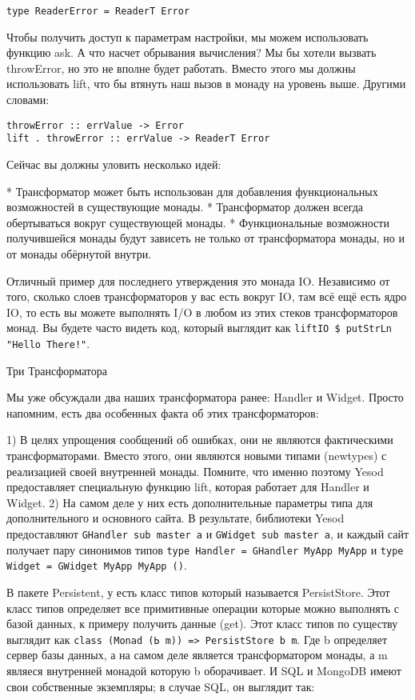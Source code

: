 \begin{lstlisting}
type ReaderError = ReaderT Error
\end{lstlisting}

Чтобы получить доступ к параметрам настройки, мы можем использовать функцию ask. А что насчет обрывания вычисления? Мы бы хотели вызвать throwError, но это не вполне будет работать. Вместо этого мы должны использовать lift, что бы втянуть наш вызов в монаду на уровень выше. Другими словами:

\begin{lstlisting}
throwError :: errValue -> Error
lift . throwError :: errValue -> ReaderT Error
\end{lstlisting}

Сейчас вы должны уловить несколько идей:

* Трансформатор может быть использован для добавления функциональных возможностей в существующие монады.
* Трансформатор должен всегда обертываться вокруг существующей монады.
* Функциональные возможности получившейся монады будут зависеть не только от трансформатора монады, но и от монады обёрнутой внутри.

Отличный пример для последнего утверждения это монада IO. Независимо от того, сколько слоев трансформаторов у вас есть вокруг IO, там всё ещё есть ядро IO, то есть вы можете выполнять I/O в любом из этих стеков трансформаторов монад. Вы будете часто видеть код, который выглядит как \lstinline'liftIO $ putStrLn "Hello There!"'.

Три Трансформатора

Мы уже обсуждали два наших трансформатора ранее: Handler и Widget. Просто напомним, есть два особенных факта об этих трансформаторов:

1) В целях упрощения сообщений об ошибках, они не являются фактическими трансформаторами. Вместо этого, они являются новыми типами (newtypes) с реализацией своей внутренней монады. Помните, что именно поэтому Yesod предоставляет специальную функцию lift, которая работает для Handler и Widget.
2) На самом деле у них есть дополнительные параметры типа для дополнительного и основного сайта. В результате, библиотеки Yesod предоставляют \lstinline'GHandler sub master a' и \lstinline'GWidget sub master a', и каждый сайт получает пару синонимов типов \lstinline'type Handler = GHandler MyApp MyApp' и \lstinline'type Widget = GWidget MyApp MyApp ()'.

В пакете Persistent, у есть класс типов который называется PersistStore. Этот класс типов определяет все примитивные операции которые можно выполнять с базой данных, к примеру получить данные (get). Этот класс типов по существу выглядит как \lstinline'class (Monad (Ь m)) => PersistStore b m'. Где b определяет сервер базы данных, а на самом деле является трансформатором монады, а m являеся внутренней монадой которую b оборачивает. И SQL и MongoDB имеют свои собственные экземпляры; в случае SQL, он выглядит так:

